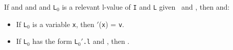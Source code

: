 \begin{Lemma}
\label{lem:key1}
If \emph{} and
\emph{} and
\emph{}
and {\tt L$_0$} is a relevant l-value of {\tt I} and {\tt L} given
\Euid\ and \Huid, then \emph{} and:
\begin{itemize}
\item If {\tt L$_0$} is a variable {\tt x}, then \Euid$'$({\tt x}) =
  {\tt v}.
\item If {\tt L$_0$} has the form {\tt L$_0'$.l} and
  ,
then .
\end{itemize}
\end{Lemma}
